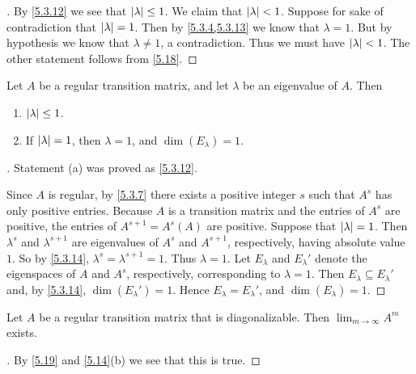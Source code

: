 \begin{proof}[]
	By \cref{5.3.12} we see that \(\left\lvert\lambda\right\rvert \leq 1\).
	We claim that \(\left\lvert\lambda\right\rvert < 1\).
	Suppose for sake of contradiction that \(\left\lvert\lambda\right\rvert = 1\).
	Then by \cref{5.3.4,5.3.13} we know that \(\lambda = 1\).
	But by hypothesis we know that \(\lambda \neq 1\), a contradiction.
	Thus we must have \(\left\lvert\lambda\right\rvert < 1\).
	The other statement follows from \cref{5.18}.
\end{proof}

\begin{thm}\label{5.19}
	Let \(A\) be a regular transition matrix, and let \(\lambda\) be an eigenvalue of \(A\).
	Then
	\begin{enumerate}
		\item \(\left\lvert\lambda\right\rvert \leq 1\).
		\item If \(\left\lvert\lambda\right\rvert = 1\), then \(\lambda = 1\), and \(\dim(E_{\lambda}) = 1\).
	\end{enumerate}
\end{thm}

\begin{proof}[]
	Statement (a) was proved as \cref{5.3.12}.

	Since \(A\) is regular, by \cref{5.3.7} there exists a positive integer \(s\) such that \(A^s\) has only positive entries.
	Because \(A\) is a transition matrix and the entries of \(A^s\) are positive, the entries of \(A^{s + 1} = A^s (A)\) are positive.
	Suppose that \(\left\lvert\lambda\right\rvert = 1\).
	Then \(\lambda^s\) and \(\lambda^{s + 1}\) are eigenvalues of \(A^s\) and \(A^{s + 1}\), respectively, having absolute value \(1\).
	So by \cref{5.3.14}, \(\lambda^s = \lambda^{s + 1} = 1\).
	Thus \(\lambda = 1\).
	Let \(E_{\lambda}\) and \(E_{\lambda}'\) denote the eigenspaces of \(A\) and \(A^s\), respectively, corresponding to \(\lambda = 1\).
	Then \(E_{\lambda} \subseteq E_{\lambda}'\) and, by \cref{5.3.14}, \(\dim(E_{\lambda}') = 1\).
	Hence \(E_{\lambda} = E_{\lambda}'\), and \(\dim(E_{\lambda}) = 1\).
\end{proof}

\begin{cor}\label{5.3.15}
	Let \(A\) be a regular transition matrix that is diagonalizable.
	Then \(\lim_{m \to \infty} A^m\) exists.
\end{cor}

\begin{proof}[]
	By \cref{5.19} and \cref{5.14}(b) we see that this is true.
\end{proof}

